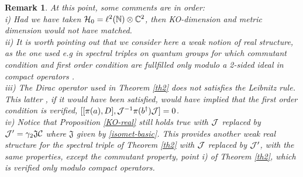 \documentclass[a4paper,11pt,twoside]{article}
\numberwithin{equation}{section}
\newtheorem{remark}[Theorem]{Remark}
\theoremstyle{nonumberplain}
\newcounter{and}
\begin{document}
\begin{remark}\label{weak-struc} At this point, some comments are in order:\\
i) Had we have taken ${\cal{H}}_0=\ell^2(\mathbb{N})\otimes\mathbb{C}^2$, then KO-dimension and metric dimension would not have matched. \\
ii) It is worth pointing out that we consider here a weak notion of real structure, as the one used e.g in spectral triples on quantum groups for which commutant condition and first order condition are fullfilled only modulo a 2-sided ideal in compact operators \cite{weak-real}.\\
iii) The Dirac operator used in Theorem \ref{th2} does not satisfies the Leibnitz rule. This latter , if it would have been satisfied, would have implied that the first order condition is verified, $[[\pi(a),D],{\cal{J}}^{-1}\pi(b^\dag){\cal{J}}]=0$. \\
iv) Notice that Proposition \ref{KO-real} still holds true with ${\cal{J}}$ replaced by ${\cal{J}}^\prime=\gamma_2\mathfrak{J}{\cal{C}} $ where $\mathfrak{J}$ given by \eqref{isomet-basic}. This provides another weak real structure for the spectral triple of 
Theorem \ref{th2} with ${\cal{J}}$ replaced by ${\cal{J}}^\prime$, with the same properties, except the commutant property, point i) of Theorem \ref{th2}, which is verified only modulo compact operators.\\
\end{remark}
\end{document}
